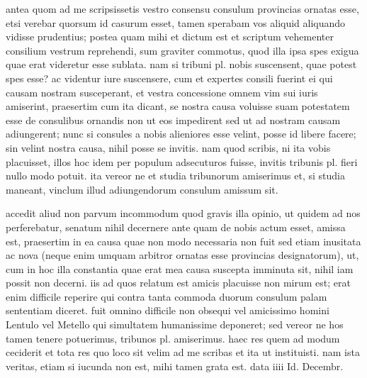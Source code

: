 


 antea quom ad me scripsissetis vestro consensu consulum provincias ornatas esse, etsi verebar quorsum id casurum esset, tamen sperabam vos aliquid aliquando vidisse prudentius; postea quam mihi et dictum est et scriptum vehementer consilium vestrum reprehendi, sum graviter commotus, quod illa ipsa spes exigua quae erat videretur esse sublata. nam si tribuni pl. nobis suscensent, quae potest spes esse? ac videntur iure suscensere, cum et expertes consili fuerint ei qui causam nostram susceperant, et vestra concessione omnem vim sui iuris amiserint, praesertim cum ita dicant, se nostra causa voluisse suam potestatem esse de consulibus ornandis non ut eos impedirent sed ut ad nostram causam adiungerent; nunc si consules a nobis alieniores esse velint, posse id libere facere; sin velint nostra causa, nihil posse se invitis. nam quod scribis, ni ita vobis placuisset, illos hoc idem per populum adsecuturos fuisse, invitis tribunis pl. fieri nullo modo potuit. ita vereor ne et studia tribunorum amiserimus et, si studia maneant, vinclum illud adiungendorum consulum amissum sit.

 accedit aliud non parvum incommodum quod gravis illa opinio, ut quidem ad nos perferebatur, senatum nihil decernere ante quam de nobis actum esset, amissa est, praesertim in ea causa quae non modo necessaria non fuit sed etiam inusitata ac nova (neque enim umquam arbitror ornatas esse provincias designatorum), ut, cum in hoc illa constantia quae erat mea causa suscepta imminuta sit, nihil iam possit non decerni. iis ad quos relatum est amicis placuisse non mirum est; erat enim difficile reperire qui contra tanta commoda duorum consulum palam sententiam diceret. fuit omnino difficile non obsequi vel amicissimo homini Lentulo vel Metello qui simultatem humanissime deponeret; sed vereor ne hos tamen tenere potuerimus, tribunos pl. amiserimus. haec res quem ad modum ceciderit et tota res quo loco sit velim ad me scribas et ita ut instituisti. nam ista veritas, etiam si iucunda non est, mihi tamen grata est. data iiii Id. Decembr.
